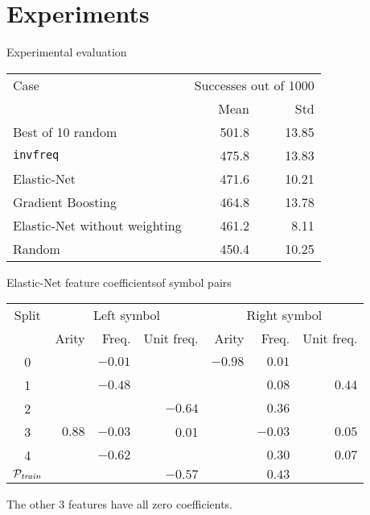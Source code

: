 \documentclass[notes]{beamer}
\begin{document}
\section{Experiments}

\begin{frame}{Experimental evaluation}
\begin{table}
\begin{tabular}{l|rr}
	Case & \multicolumn{2}{c}{Successes out of 1000} \\
	& Mean & Std \\
	\hline
	Best of 10 random & 501.8 & 13.85 \\
	\texttt{invfreq} & 475.8 & 13.83 \\
	Elastic-Net & 471.6 & 10.21 \\
	Gradient Boosting & 464.8 & 13.78 \\
	Elastic-Net without weighting & 461.2 & 8.11 \\
	Random & 450.4 & 10.25 \\
\end{tabular}
\end{table}
\end{frame}

\begin{frame}{Elastic-Net feature coefficients}{of symbol pairs}
\begin{table}
\begin{tabular}{c|rrr|rrr}
	Split & \multicolumn{3}{c}{Left symbol} & \multicolumn{3}{c}{Right symbol} \\
	& Arity & Freq. & Unit freq. & Arity & Freq. & Unit freq. \\
	\hline
	0 &     &$-0.01$&     &$-0.98$&$ 0.01$&      \\
	1 &     &$-0.48$&     &     &$ 0.08$&$ 0.44 $\\
	2 &     &     &$-0.64$&     &$ 0.36$&      \\
	3 &$ 0.88$&$-0.03$& 0.01&     &$-0.03$&$ 0.05 $\\
	4 &     &$-0.62$&     &     &$ 0.30$&$ 0.07 $\\
	\hline
	\(\mathcal{P}_{\mathit{train}}\) &     &     &$-0.57$&     &$ 0.43$&      \\
\end{tabular}
\end{table}

The other 3 features have all zero coefficients.
\end{frame}
\end{document}
